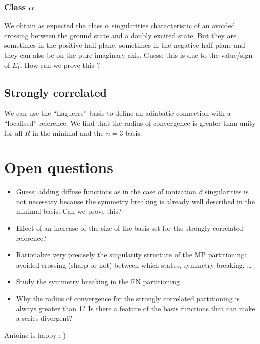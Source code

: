 \documentclass{article}
\begin{document}
\subsubsection{Class $\alpha$}

We obtain as expected the class $\alpha$ singularities characteristic of an avoided crossing between the ground state and a doubly excited state. 
But they are sometimes in the positive half plane, sometimes in the negative half plane and they can also be on the pure imaginary axis.
Guess: this is due to the value/sign of $E_1$. 
How can we prove this ?

\subsection{Strongly correlated}

We can use the ``Laguerre'' basis to define an adiabatic connection with a ``localised'' reference. 
We find that the radius of convergence is greater than unity for all $R$ in the minimal and the $n = 3$ basis. 

\section{Open questions}

\begin{itemize}
	\item Guess: adding diffuse functions as in the case of ionization $\beta$ singularities is not necessary because the symmetry breaking is already well described in the minimal basis. 
	Can we prove this?
	\item Effect of an increase of the size of the basis set for the strongly correlated reference?
	\item Rationalize very precisely the singularity structure of the MP partitioning: avoided crossing (sharp or not) between which states, symmetry breaking, \ldots
	\item Study the symmetry breaking in the EN partitioning
	\item Why the radius of convergence for the strongly correlated partitioning is always greater than 1? 
	Is there a feature of the basis functions that can make a series divergent?
\end{itemize}

Antoine is happy :-)
\end{document}
